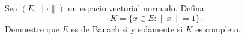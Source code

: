 Sea $(E, \| \cdot \|)$ un espacio vectorial normado. Defina
\[
K = \{x \in E : \|x\| = 1\}.
\]
Demuestre que $E$ es de Banach si y solamente si $K$ es completo.